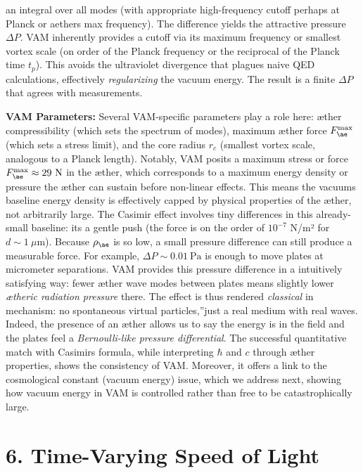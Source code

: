 \documentclass[a4paper, aps,preprint,superscriptaddress, 12pt]{revtex4}
\begin{document}
an integral over all modes (with appropriate high-frequency cutoff perhaps at Planck or aether\rqs s max frequency). The difference yields the attractive pressure $\Delta P$. VAM inherently provides a cutoff via its maximum frequency or smallest vortex scale (on order of the Planck frequency or the reciprocal of the Planck time $t_p$). This avoids the ultraviolet divergence that plagues naive QED calculations, effectively \textit{regularizing} the vacuum energy. The result is a finite $\Delta P$ that agrees with measurements.


\textbf{VAM Parameters:} Several VAM-specific parameters play a role here: æther compressibility (which sets the spectrum of modes), maximum æther force $F_{\ae}^{\max}$ (which sets a stress limit), and the core radius $r_c$ (smallest vortex scale, analogous to a Planck length). Notably, VAM posits a maximum stress or force $F_{\ae}^{\max}\approx29~\text{N}$ in the æther, which corresponds to a maximum energy density or pressure the æther can sustain before non-linear effects. This means the vacuum\rqs s baseline energy density is effectively capped by physical properties of the æther, not arbitrarily large. The Casimir effect involves tiny differences in this already-small baseline: it\rqs s a gentle push (the force is on the order of $10^{-7}$ N/m² for $d\sim1~\mu$m). Because $\rho_{\ae}$ is so low, a small pressure difference can still produce a measurable force. For example, $\Delta P \sim 0.01~\text{Pa}$ is enough to move plates at micrometer separations. VAM provides this pressure difference in a intuitively satisfying way: fewer æther wave modes between plates means slightly lower \textit{ætheric radiation pressure} there. The effect is thus rendered \textit{classical} in mechanism: no spontaneous \grqq virtual particles,\textquotedblright just a real medium with real waves. Indeed, the presence of an æther allows us to say the energy is in the field and the plates feel a \textit{Bernoulli-like pressure differential}. The successful quantitative match with Casimir\rqs s formula, while interpreting $\hbar$ and $c$ through æther properties, shows the consistency of VAM. Moreover, it offers a link to the cosmological constant (vacuum energy) issue, which we address next, showing how vacuum energy in VAM is controlled rather than free to be catastrophically large.


\section*{6. Time-Varying Speed of Light}
\end{document}
